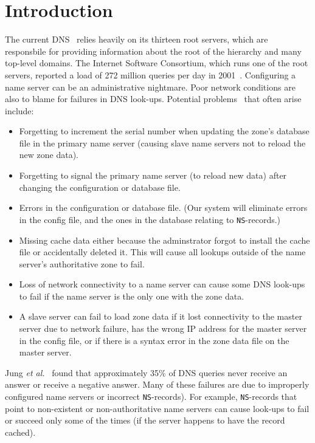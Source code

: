 \section{Introduction}

The current DNS~\cite{dns, dns-concept:rfc} relies heavily on its
thirteen root servers, which are responsbile for providing
information about the root of the hierarchy and many top-level domains.
The Internet Software Consortium, which runs one of the root servers,
reported a load of 272 million queries per day in 2001~\cite{isc-root}.
Configuring a name server can be an administrative nightmare.
Poor network conditions are also to blame for failures in DNS look-ups.
Potential problems~\cite{dns-bind} that often arise include: 
\begin{itemize}
\item Forgetting to increment the serial number when updating the 
zone's database file in the primary name server (causing slave name 
servers not to reload the new zone data).
\item Forgetting to signal the primary name server 
(to reload new data) after 
changing the configuration or database file. 
\item Errors in the configuration or database file. 
(Our system will eliminate errors in the config file, 
and the ones in the database relating to {\tt NS}-records.) 
\item Missing cache data either because the adminstrator 
forgot to install the cache file or accidentally deleted it. 
This will cause all lookups outside 
of the name server's authoritative zone to fail. 
\item Loss of network connectivity to a name server 
can cause some DNS look-ups to fail if the name server is
the only one with the zone data. 
\item A slave server can fail to load zone data 
if it lost connectivity to the master server due to 
network failure, has the wrong IP address for
the master server in the config file, or if there is 
a syntax error in the zone data file on the master server.
\end{itemize}

Jung {\it et al.}~\cite{dnscache:sigcommimw01} found that approximately
35\% of DNS queries never receive an answer or receive
a negative answer. Many of these failures are due to 
improperly configured name servers or incorrect {\tt NS}-records).
For example, {\tt NS}-records that point to non-existent 
or non-authoritative name servers can cause look-ups to fail
or succeed only some of the times (if the server happens
to have the record cached).

